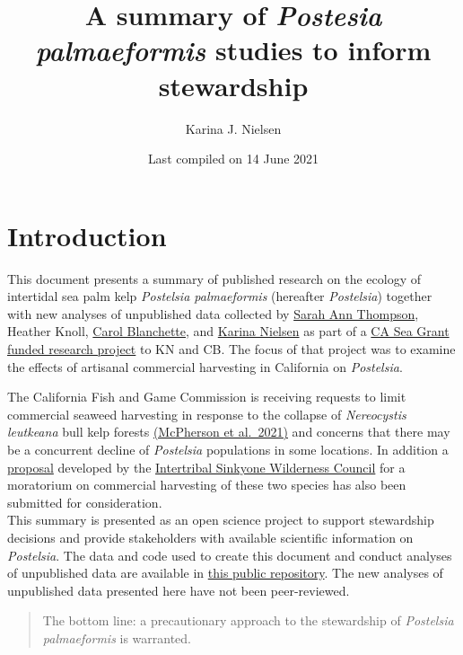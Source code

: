 \documentclass[
]{article}
\title{A summary of \emph{Postesia palmaeformis} studies to inform stewardship}
\author{Karina J. Nielsen}
\date{Last compiled on 14 June 2021}
\begin{document}
\maketitle

{
\setcounter{tocdepth}{2}
\tableofcontents
}
\hypertarget{introduction}{%
\section{Introduction}\label{introduction}}

This document presents a summary of published research on the ecology of intertidal sea palm kelp \emph{Postelsia palmaeformis} (hereafter \emph{Postelsia}) together with new analyses of unpublished data collected by \href{http://www.faralloninstitute.org/sarah-ann}{Sarah Ann Thompson}, Heather Knoll, \href{https://vesr.nrs.ucsb.edu/about/people/dr-carol-blanchette}{Carol Blanchette}, and \href{https://karinanielsen.io/}{Karina Nielsen} as part of a \href{https://caseagrant.ucsd.edu/sites/default/files/RCZ-200-Nielsen.pdf}{CA Sea Grant funded research project} to KN and CB. The focus of that project was to examine the effects of artisanal commercial harvesting in California on \emph{Postelsia}.

The California Fish and Game Commission is receiving requests to limit commercial seaweed harvesting in response to the collapse of \emph{Nereocystis leutkeana} bull kelp forests \href{https://www.nature.com/articles/s42003-021-01827-6}{(McPherson et al.~2021)} and concerns that there may be a concurrent decline of \emph{Postelsia} populations in some locations. In addition a \href{https://static1.squarespace.com/static/5db26a9129f30174496b208b/t/608106c52665aa1e0bb1ab43/1619068616608/DRAFT+Tribal+Proposal+for+Amending+Commercial+Kelp+\%26+Seaweed+Rules-Updated+4.21.2021-PDF.pdf}{proposal} developed by the \href{https://sinkyone.org/}{Intertribal Sinkyone Wilderness Council} for a moratorium on commercial harvesting of these two species has also been submitted for consideration.\\
This summary is presented as an open science project to support stewardship decisions and provide stakeholders with available scientific information on \emph{Postelsia}. The data and code used to create this document and conduct analyses of unpublished data are available in \href{https://github.com/phyllospadix/postelsia}{this public repository}. The new analyses of unpublished data presented here have not been peer-reviewed.

\begin{quote}
The bottom line: a precautionary approach to the stewardship of \emph{Postelsia palmaeformis} is warranted.
\end{quote}
\end{document}
